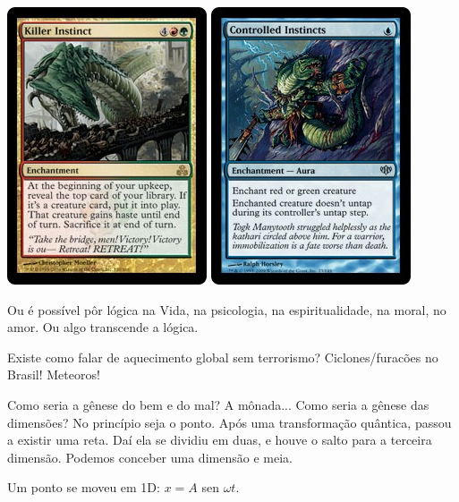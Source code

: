 \documentclass[12pt,a4paper]{article}
\begin{document}
\begin{center}
			\includegraphics{killer} \includegraphics{controlled}
		\end{center}

		Ou \'e poss\'ivel p\^or l\'ogica na Vida, na psicologia, na espiritualidade, na moral, no amor. Ou algo transcende a l\'ogica.

		Existe como falar de aquecimento global sem terrorismo? Ciclones/furac\~oes no Brasil! Meteoros!

		\begin{flushright}
		\end{flushright}

		Como seria a g\^enese do bem e do mal? A m\^onada... Como seria a g\^enese das dimens\~oes? No princ\'ipio seja o ponto. Ap\'os uma transforma\c{c}\~ao qu\^antica, passou a existir uma reta. Da\'i ela se dividiu em duas, e houve o salto para a terceira dimens\~ao. Podemos conceber uma dimens\~ao e meia.

		Um ponto se moveu em 1D: $x = A $ sen $\omega t$.
\end{document}
